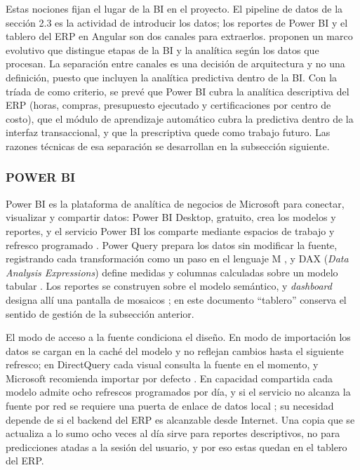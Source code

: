 Estas nociones fijan el lugar de la BI en el proyecto. El pipeline de datos de la sección 2.3 es la actividad de introducir los datos; los reportes de Power BI y el tablero del ERP en Angular son dos canales para extraerlos. \textcite{Chen2012} proponen un marco evolutivo que distingue etapas de la BI y la analítica según los datos que procesan. La separación entre canales es una decisión de arquitectura y no una definición, puesto que \textcite{Watson2007} incluyen la analítica predictiva dentro de la BI\@. Con la tríada de \textcite{Lepenioti2020} como criterio, se prevé que Power BI cubra la analítica descriptiva del ERP (horas, compras, presupuesto ejecutado y certificaciones por centro de costo), que el módulo de aprendizaje automático cubra la predictiva dentro de la interfaz transaccional, y que la prescriptiva quede como trabajo futuro. Las razones técnicas de esa separación se desarrollan en la subsección siguiente.

\subsubsection{POWER BI}

Power BI es la plataforma de analítica de negocios de Microsoft para conectar, visualizar y compartir datos: Power BI Desktop, gratuito, crea los modelos y reportes, y el servicio Power BI los comparte mediante espacios de trabajo y refresco programado \parencite{MSPowerBIOverview, MSDAXOverview}. Power Query prepara los datos sin modificar la fuente, registrando cada transformación como un paso en el lenguaje M \parencite{MSPowerQueryWhatIs}, y DAX (\textit{Data Analysis Expressions}) define medidas y columnas calculadas sobre un modelo tabular \parencite{MSDAXOverview}. Los reportes se construyen sobre el modelo semántico, y \textit{dashboard} designa allí una pantalla de mosaicos \parencite{MSPowerBIServiceConcepts}; en este documento ``tablero'' conserva el sentido de gestión de la subsección anterior.

El modo de acceso a la fuente condiciona el diseño. En modo de importación los datos se cargan en la caché del modelo y no reflejan cambios hasta el siguiente refresco; en DirectQuery cada visual consulta la fuente en el momento, y Microsoft recomienda importar por defecto \parencite{MSPowerBIDirectQuery}. En capacidad compartida cada modelo admite ocho refrescos programados por día, y si el servicio no alcanza la fuente por red se requiere una puerta de enlace de datos local \parencite{MSPowerBIRefresh, MSPowerBIGateway}; su necesidad depende de si el backend del ERP es alcanzable desde Internet. Una copia que se actualiza a lo sumo ocho veces al día sirve para reportes descriptivos, no para predicciones atadas a la sesión del usuario, y por eso estas quedan en el tablero del ERP.

